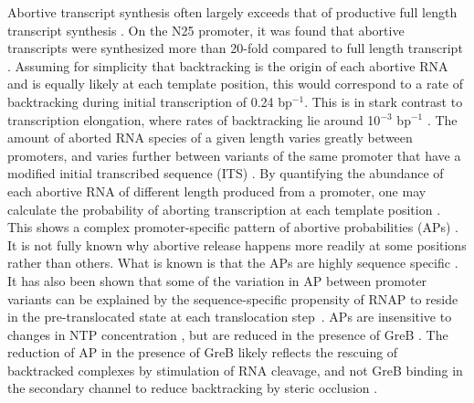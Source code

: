 Abortive transcript synthesis often largely exceeds that of productive full
length transcript synthesis \cite{carpousis_cycling_1980, hsu_initial_2006}.
On the N25 promoter, it was found that abortive transcripts were synthesized
more than 20-fold compared to full length transcript \cite{hsu_initial_2006}.
Assuming for simplicity that backtracking is the origin of each abortive RNA
and is equally likely at each template position, this would correspond to a
rate of backtracking during initial transcription of 0.24 bp$^{-1}$.
This is in stark contrast to transcription elongation, where rates of
backtracking lie around 10$^{-3}$ bp$^{-1}$ \cite{shaevitz_backtracking_2003}.
The amount of aborted RNA species of a given length varies greatly between
promoters, and varies further between variants of the same promoter that have
a modified initial transcribed sequence (ITS) \cite{hsu_promoter_2002}. By
quantifying the abundance of each abortive RNA of different length produced
from a promoter, one may calculate the probability of aborting transcription at
each template position \cite{hsu_quantitative_1996}.  This shows a complex
promoter-specific pattern of abortive probabilities (APs)
\cite{hsu_initial_2006,hsu_vitro_2003}. It is not fully known why abortive
release happens more readily at some positions rather than others. What is
known is that the APs are highly sequence specific \cite{hsu_vitro_2006}. It
has also been shown that some of the variation in AP between promoter variants
can be explained by the sequence-specific propensity of RNAP to reside in the
pre-translocated state at each translocation
step~\cite{skancke_sequence-dependent_2015}. APs are insensitive to changes in
NTP concentration \cite{hsu_vitro_2003}, but are reduced in the presence of
GreB \cite{hsu_initial_2006}. The reduction of AP in the presence of GreB
likely reflects the rescuing of backtracked complexes by stimulation of RNA
cleavage, and not GreB binding in the secondary channel to reduce backtracking
by steric occlusion \cite{opalka_structure_2003, hsu_initial_2006}.

